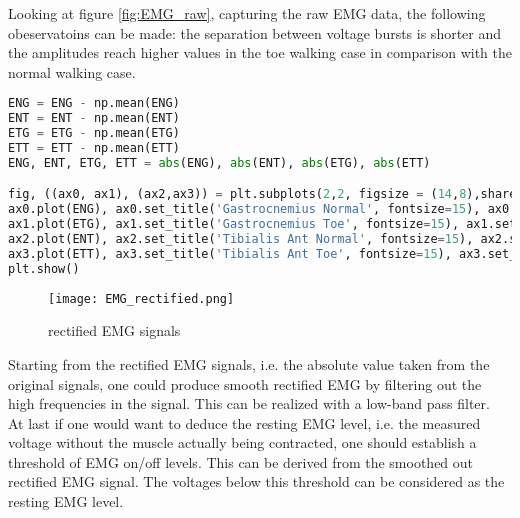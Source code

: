 \documentclass[english, a4paper, 11pt]{article}
\begin{document}
Looking at figure \ref*{fig:EMG_raw}, capturing the raw EMG data, the following obeservatoins can be made:
the separation between voltage bursts is shorter and the amplitudes reach higher values in the toe walking case
in comparison with the normal walking case.

    \begin{lstlisting}[language=Python, caption=rectified EMG calculation and plotting]
ENG = ENG - np.mean(ENG)
ENT = ENT - np.mean(ENT)
ETG = ETG - np.mean(ETG)
ETT = ETT - np.mean(ETT)
ENG, ENT, ETG, ETT = abs(ENG), abs(ENT), abs(ETG), abs(ETT)

fig, ((ax0, ax1), (ax2,ax3)) = plt.subplots(2,2, figsize = (14,8),sharey=True)
ax0.plot(ENG), ax0.set_title('Gastrocnemius Normal', fontsize=15), ax0.set_xlim(0,10000), ax0.set_ylabel('Voltage [V]', fontsize=15)
ax1.plot(ETG), ax1.set_title('Gastrocnemius Toe', fontsize=15), ax1.set_xlim(0,10000)
ax2.plot(ENT), ax2.set_title('Tibialis Ant Normal', fontsize=15), ax2.set_xlim(0,10000), ax2.set_ylabel('Voltage [V]', fontsize=15)
ax3.plot(ETT), ax3.set_title('Tibialis Ant Toe', fontsize=15), ax3.set_xlim(0,10000)
plt.show()
    \end{lstlisting}

    \begin{figure}[!h]
        \centering
        \texttt{[image: EMG\_rectified.png]}
        \caption{rectified EMG signals}
        \label{fig:EMG_rect}
    \end{figure}

Starting from the rectified EMG signals, i.e. the absolute value taken from the original signals, one could produce smooth rectified EMG by filtering out the high frequencies in the signal. 
This can be realized with a low-band pass filter.\\
At last if one would want to deduce the resting EMG level, i.e. the measured voltage without the muscle actually being contracted, one should establish a threshold of EMG on/off levels.
This can be derived from the smoothed out rectified EMG signal. The voltages below this threshold can be considered as the resting EMG level.
\end{document}
